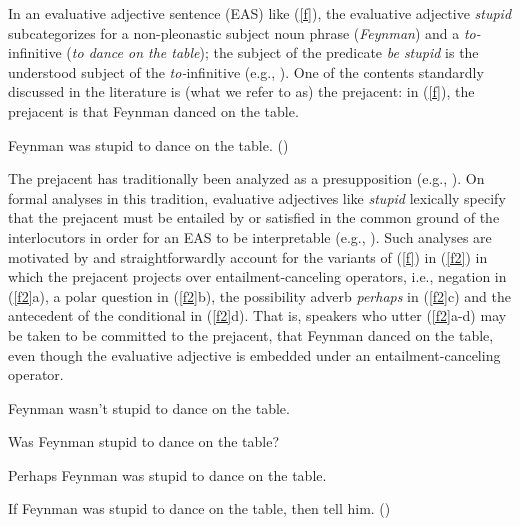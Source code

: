 \documentclass[11pt,fleqn]{article}
\newcommand{\6}{\mbox{$[\hspace*{-.6mm}[$}}
\newcommand{\9}{\mbox{$]\hspace*{-.6mm}]$}}
\begin{document}
In an evaluative adjective sentence (EAS) like (\ref{f}), the
evaluative adjective {\em stupid} subcategorizes for a non-pleonastic subject noun
phrase ({\em Feynman}) and a {\em to-}infinitive ({\em to
dance on the table}); the subject of the predicate {\em be stupid} is the understood subject of the {\em to-}infinitive (e.g., \citealt{wilkinson70, norrick78,barker02,kertz2010}). One of the contents standardly discussed in the literature is (what we refer to as) the prejacent: in (\ref{f}), the prejacent is that Feynman danced on the table.

\begin{exe} 
\ex\label{f} Feynman was stupid to dance on the table. \hfill (\citealt[18]{barker02})
\end{exe} 
The prejacent has traditionally been analyzed as a presupposition (e.g., \citealt{norrick78,barker02,oshima09b,kertz2010}). On formal analyses in this tradition, evaluative adjectives like {\em stupid} lexically specify that the prejacent
must be entailed by or satisfied in the common ground of the interlocutors in
order for an EAS to be interpretable (e.g.,
\citealt{heim83,vds92}). Such analyses are motivated by and straightforwardly account for the variants of (\ref{f}) in (\ref{f2}) in which the prejacent projects over entailment-canceling operators, i.e., negation in (\ref{f2}a), a polar question in (\ref{f2}b), the possibility adverb {\em perhaps} in (\ref{f2}c) and the antecedent of the conditional in (\ref{f2}d). That is, speakers who utter (\ref{f2}a-d) may be taken to be committed to the prejacent, that Feynman danced on the table, even though the evaluative adjective is embedded under an entailment-canceling operator. 

\begin{exe}

\ex\label{f2} 

\begin{xlist}

\ex Feynman wasn't stupid to dance on the table.

\ex Was Feynman stupid to dance on the table?

\ex Perhaps Feynman was stupid to dance on the table.

\ex If Feynman was stupid to dance on the table, then tell him. \hfill (\citealt[18f.]{barker02})

\end{xlist}
\end{exe}
\end{document}
